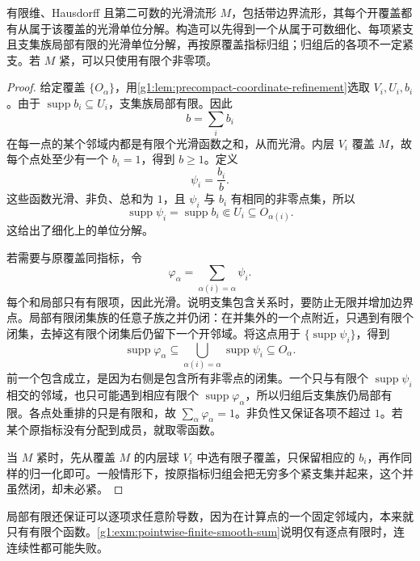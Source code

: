 \begin{theorem}\label{g1:thm:smooth-partition-unity}
	有限维、Hausdorff 且第二可数的光滑流形 \(M\)，包括带边界流形，其每个开覆盖都有从属于该覆盖的光滑单位分解。构造可以先得到一个从属于可数细化、每项紧支且支集族局部有限的光滑单位分解，再按原覆盖指标归组；归组后的各项不一定紧支。若 \(M\) 紧，可以只使用有限个非零项。
\end{theorem}
\begin{proof}
	给定覆盖 \(\{O_\alpha\}\)，用\cref{g1:lem:precompact-coordinate-refinement}选取 \(V_i,U_i,b_i\)。由于 \(\operatorname{supp}b_i\subseteq U_i\)，支集族局部有限。因此
	\[
		b=\sum_i b_i
	\]
	在每一点的某个邻域内都是有限个光滑函数之和，从而光滑。内层 \(V_i\) 覆盖 \(M\)，故每个点处至少有一个 \(b_i=1\)，得到 \(b\ge1\)。定义
	\[
		\psi_i=\frac{b_i}{b}.
	\]
	这些函数光滑、非负、总和为 \(1\)，且 \(\psi_i\) 与 \(b_i\) 有相同的非零点集，所以
	\[
		\operatorname{supp}\psi_i=\operatorname{supp}b_i\Subset U_i\subseteq O_{\alpha(i)}.
	\]
	这给出了细化上的单位分解。

	若需要与原覆盖同指标，令
	\[
		\varphi_\alpha=\sum_{\alpha(i)=\alpha}\psi_i.
	\]
	每个和局部只有有限项，因此光滑。说明支集包含关系时，要防止无限并增加边界点。局部有限闭集族的任意子族之并仍闭：在并集外的一个点附近，只遇到有限个闭集，去掉这有限个闭集后仍留下一个开邻域。将这点用于 \(\{\operatorname{supp}\psi_i\}\)，得到
	\[
		\operatorname{supp}\varphi_\alpha
		\subseteq\bigcup_{\alpha(i)=\alpha}\operatorname{supp}\psi_i
		\subseteq O_\alpha.
	\]
	前一个包含成立，是因为右侧是包含所有非零点的闭集。一个只与有限个 \(\operatorname{supp}\psi_i\) 相交的邻域，也只可能遇到相应有限个 \(\operatorname{supp}\varphi_\alpha\)，所以归组后支集族仍局部有限。各点处重排的只是有限和，故 \(\sum_\alpha\varphi_\alpha=1\)。非负性又保证各项不超过 \(1\)。若某个原指标没有分配到成员，就取零函数。

	当 \(M\) 紧时，先从覆盖 \(M\) 的内层球 \(V_i\) 中选有限子覆盖，只保留相应的 \(b_i\)，再作同样的归一化即可。一般情形下，按原指标归组会把无穷多个紧支集并起来，这个并虽然闭，却未必紧。
\end{proof}

局部有限还保证可以逐项求任意阶导数，因为在计算点的一个固定邻域内，本来就只有有限个函数。\cref{g1:exm:pointwise-finite-smooth-sum}说明仅有逐点有限时，连连续性都可能失败。

